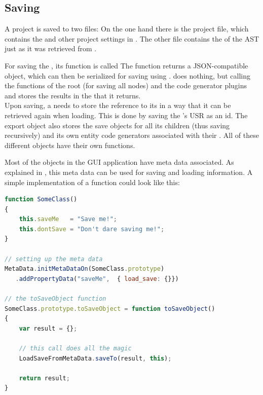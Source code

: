 \subsection{Saving}

A project is saved to two files: On the one hand there is the project file, which contains the  and other project settings in . The other file contains the  of the  AST just as it was retrieved from .

For saving the , its  function is called The function returns a JSON-compatible object, which can then be serialized for saving using .  does nothing, but calling the  functions of the root \linebreak{} (for saving all nodes) and the code generator plugins and stores the results in the  that it returns.\\
Upon saving, a  needs to store the reference to its  in a way that it can be retrieved again when loading. This is done by saving the 's USR as an id. The export object also stores the save objects for all its children (thus saving recursively) and its own entity code generators associated with their . All of these different  objects have their own  functions.

Most of the objects in the GUI application have meta data associated. As explained in , this meta data can be used for saving and loading information. A simple implementation of a  function could look like this:

\SingleSpacing
\begin{lstlisting}[language=JavaScript, caption=Saving using meta data, label=lst:MetaDataSave]
function SomeClass()
{
	this.saveMe   = "Save me!";
	this.dontSave = "Don't dare saving me!";
}

// setting up the meta data
MetaData.initMetaDataOn(SomeClass.prototype)
   .addPropertyData("saveMe",  { load_save: {}})

// the toSaveObject function
SomeClass.prototype.toSaveObject = function toSaveObject()
{
	var result = {};
	
	// this call does all the magic
	LoadSaveFromMetaData.saveTo(result, this);
	
	return result;
}
\end{lstlisting}
\OnehalfSpacing

